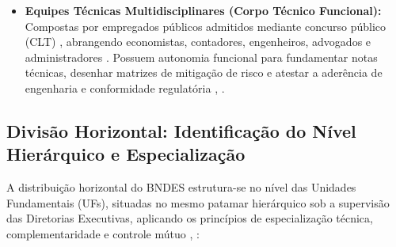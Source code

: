 \begin{itemize}
    \item \textbf{Equipes Técnicas Multidisciplinares (Corpo Técnico Funcional):} Compostas por empregados públicos admitidos mediante concurso público (CLT) \cite[art.~79]{bndes2025estatuto}, abrangendo economistas, contadores, engenheiros, advogados e administradores \cite[p.~11, item II.7; p.~45, 172]{bndes2026oib}. Possuem autonomia funcional para fundamentar notas técnicas, desenhar matrizes de mitigação de risco e atestar a aderência de engenharia e conformidade regulatória \cite[art.~7º,~I]{bndes2025estatuto}, \cite[p.~45, 172]{bndes2026oib}.
\end{itemize}

\subsection{Divisão Horizontal: Identificação do Nível Hierárquico e Especialização}

A distribuição horizontal do BNDES estrutura-se no nível das Unidades Fundamentais (UFs), situadas no mesmo patamar hierárquico sob a supervisão das Diretorias Executivas, aplicando os princípios de especialização técnica, complementaridade e controle mútuo \cite[art.~78]{bndes2025estatuto}, \cite[p.~10--11]{bndes2026oib}:


